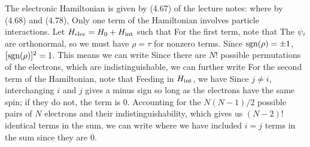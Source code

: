 \documentclass[11pt]{article}
\begin{document}
{	The electronic Hamiltonian is given by (4.67) of the lecture notes:
	where by (4.68) and (4.78),
	Only one term of the Hamiltonian involves particle interactions.  Let $H_\text{elec} = H_0 + H_\text{int}$ such that
	For the first term, note that
	The $\psi_i$ are orthonormal, so we must have $\rho = \tau$ for nonzero terms.  Since $\text{sgn}(\rho) = \pm 1$, $[\text{sgn}(\rho)]^2 = 1$.  This means we can write
	Since there are $N!$ possible permutations of the electrons, which are indistinguishable, we can further write
	For the second term of the Hamiltonian, note that
	Feeding in $H_\text{int}$, we have
	Since $j \neq i$, interchanging $i$ and $j$ gives a minus sign so long as the electrons have the same spin; if they do not, the term is 0.  Accounting for the $N (N - 1) / 2$ possible pairs of $N$ electrons and their indistinguishability, which gives us $(N - 2)!$ identical terms in the sum, we can write
	where we have included $i = j$ terms in the sum since they are 0.
	
}
\end{document}
